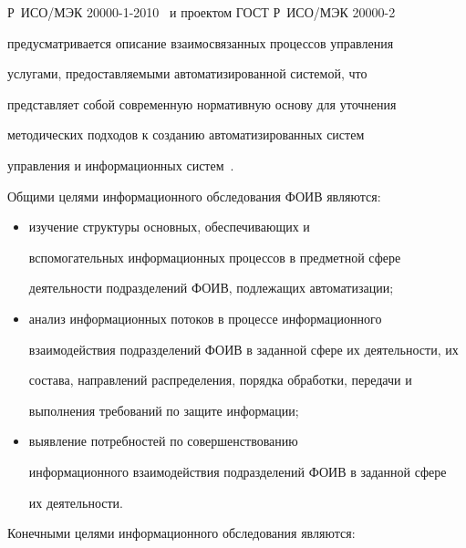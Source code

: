 Р~ИСО/МЭК 20000-1-2010~\cite{6-2-4} и проектом ГОСТ Р~ИСО/МЭК 20000-2 


предусматривается описание взаимосвязанных процессов управ\-ле\-ния 


услугами, предоставляемыми автоматизированной сис\-те\-мой, что 


представляет собой современную нормативную основу для уточнения 


методических подходов к созданию автоматизированных сис\-тем 


       управ\-ле\-ния и информационных сис\-тем~\cite{8-2-4}.


       


       Общими целями информационного обследования ФОИВ являются:


       \begin{itemize}


       \item  изучение структуры основных, обеспечивающих и 


вспомогательных информационных процессов в предметной сфере 


деятельности подразделений \mbox{ФОИВ}, подлежащих автоматизации;


       \item  анализ информационных потоков в процессе информационного 


взаимодействия подразделений ФОИВ в заданной сфере их деятельности, их 


состава, направлений распределения, порядка обработки, передачи и 


выполнения требований по защите информации;


       \item выявление потребностей по совершенствованию 


информационного взаимодействия подразделений ФОИВ в заданной сфере 


их деятельности.


       \end{itemize}


       


       Конечными целями информационного обследования являются:


